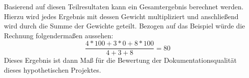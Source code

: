 Basierend auf diesen Teilresultaten kann ein Gesamtergebnis berechnet werden. Hierzu wird jedes Ergebnis mit dessen Gewicht multipliziert und anschließend wird durch die Summe der Gewichte geteilt. Bezogen auf das Beispiel würde die Rechnung folgendermaßen aussehen:
\begin{equation}
    \frac{4*100 + 3*0 + 8*100}{4+3+8}=80
\end{equation}
Dieses Ergebnis ist dann Maß für die Bewertung der Dokumentationsqualität dieses hypothetischen Projektes. 








